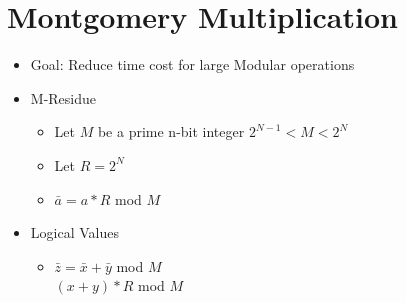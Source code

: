 \section{Montgomery Multiplication}
\begin{itemize}
\item Goal: Reduce time cost for large Modular operations
\item M-Residue
    \begin{itemize}
    \item Let $M$ be a prime n-bit integer $2^{N-1} < M < 2^N$
    \item Let $R = 2^N$
    \item $\bar{a} = a*R$ mod $M$
    \end{itemize}
\item Logical Values
    \begin{itemize}
    \item $\bar{z} = \bar{x} + \bar{y}$ mod $M$
        \\$(x+y)*R$ mod $M$
    \end{itemize}
\end{itemize}